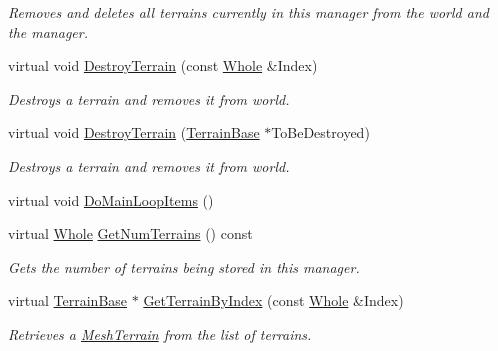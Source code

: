 \begin{DoxyCompactItemize}
\begin{DoxyCompactList}\small\item\em Removes and deletes all terrains currently in this manager from the world and the manager. \item\end{DoxyCompactList}\item 
virtual void \hyperlink{classMezzanine_1_1TerrainManager_a058a5c44e55fb80a03a2076effc424c3}{DestroyTerrain} (const \hyperlink{namespaceMezzanine_adcbb6ce6d1eb4379d109e51171e2e493}{Whole} \&Index)
\begin{DoxyCompactList}\small\item\em Destroys a terrain and removes it from world. \item\end{DoxyCompactList}\item 
virtual void \hyperlink{classMezzanine_1_1TerrainManager_aadac3792e3b2819e7ac0dec84a8399b6}{DestroyTerrain} (\hyperlink{classMezzanine_1_1TerrainBase}{TerrainBase} $\ast$ToBeDestroyed)
\begin{DoxyCompactList}\small\item\em Destroys a terrain and removes it from world. \item\end{DoxyCompactList}\item 
virtual void \hyperlink{classMezzanine_1_1TerrainManager_a442a1e72a38fe959b15a7f5eeff455fc}{DoMainLoopItems} ()
\item 
virtual \hyperlink{namespaceMezzanine_adcbb6ce6d1eb4379d109e51171e2e493}{Whole} \hyperlink{classMezzanine_1_1TerrainManager_a586514cfc367b5852612292cab69a8b7}{GetNumTerrains} () const 
\begin{DoxyCompactList}\small\item\em Gets the number of terrains being stored in this manager. \item\end{DoxyCompactList}\item 
virtual \hyperlink{classMezzanine_1_1TerrainBase}{TerrainBase} $\ast$ \hyperlink{classMezzanine_1_1TerrainManager_a6ac0d776447d798c07f801b29109228b}{GetTerrainByIndex} (const \hyperlink{namespaceMezzanine_adcbb6ce6d1eb4379d109e51171e2e493}{Whole} \&Index)
\begin{DoxyCompactList}\small\item\em Retrieves a \hyperlink{classMezzanine_1_1MeshTerrain}{MeshTerrain} from the list of terrains. \item\end{DoxyCompactList}\item 

\end{DoxyCompactItemize}
